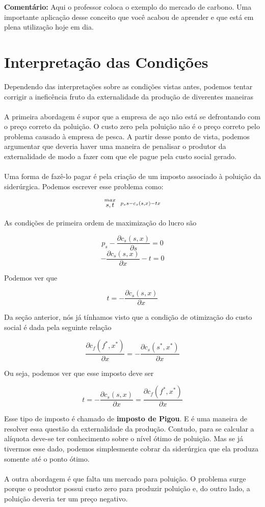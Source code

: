 \documentclass[a4paper,11pt,oneside]{book}
\theoremstyle{definition}
\theoremstyle{break}
\begin{document}
\textbf{Comentário: } Aqui o professor coloca o exemplo do mercado de carbono. Uma importante aplicação desse conceito que você acabou de aprender e que está em plena utilização hoje em dia.

\section{Interpretação das Condições}

Dependendo das interpretações sobre as condições vistas antes, podemos tentar corrigir a ineficência fruto da externalidade da produção de diverentes maneiras
\\
\\
A primeira abordagem é supor que a empresa de aço não está se defrontando com o preço correto da poluição. O custo zero pela poluição não é o preço correto pelo problema causado à empresa de pesca. A partir desse ponto de vista, podemos argumentar que deveria haver uma maneira de penalisar o produtor da externalidade de modo a fazer com que ele pague pela custo social gerado.
\\
\\
Uma forma de fazê-lo pagar é pela criação de um imposto associado à poluição da siderúrgica. Podemos escrever esse problema como:

\begin{center}
	\LARGE $$ \stackrel{max}{\text{\small $s,t$}} \ \ %
	\stackrel{p_ss - c_s(s,x) - tx}{\ } $$ %
\end{center}

As condições de primeira ordem de maximização do lucro são

$$ p_s - \frac{\partial c_s(s,x)}{\partial s} = 0 $$
$$ - \frac{\partial c_s(s,x)}{\partial x} - t = 0 $$

Podemos ver que

$$ t = - \frac{\partial c_s(s,x)}{\partial x} $$

Da seção anterior, nós já tínhamos visto que a condição de otimização do custo social é dada pela seguinte relação 

$$\frac{\partial c_f(f^*,x^*)}{\partial x} = - \frac{\partial c_s(s^*,x^*)}{\partial x} $$

Ou seja, podemos ver que esse imposto deve ser

$$ t = - \frac{\partial c_s(s,x)}{\partial x} = \frac{\partial c_f(f^*,x^*)}{\partial x} $$

Esse tipo de imposto é chamado de \textbf{imposto de Pigou}. E é uma maneira de resolver essa questão da externalidade da produção. Contudo, para se calcular a alíquota deve-se ter conhecimento sobre o nível ótimo de poluição. Mas se já tivermos esse dado, podemos simplesmente cobrar da siderúrgica que ela produza somente até o ponto ótimo.
\\
\\
A outra abordagem é que falta um mercado para poluição. O problema surge porque o produtor possui custo zero para produzir poluição e, do outro lado, a poluição deveria ter um preço negativo.
\end{document}
